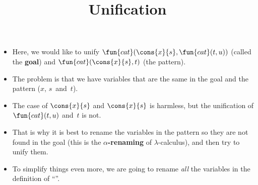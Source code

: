 \documentclass[wide]{slides}
\begin{document}
\begin{slide}
  \title{Unification}

  \begin{itemize}

    \item Here, we would like to unify
      \(\fun{cat}(\cons{x}{s},\fun{cat}(t,u))\) (called the
      \textbf{goal}) and \(\fun{cat}(\cons{x}{s},t)\) (the pattern).

    \item The problem is that we have variables that are the same in
      the goal and the pattern (\(x\), \(s\)~and~\(t\)).

    \item The case of \(\cons{x}{s}\) and \(\cons{x}{s}\) is harmless,
      but the unification of \(\fun{cat}(t,u)\) and~\(t\) is not.

    \item That is why it is best to rename the variables in the
      pattern so they are not found in the goal (this is the
      \textbf{\(\alpha\)\hyp{}renaming} of \(\lambda\)\hyp{}calculus),
      and then try to unify them.

    \item To simplify things even more, we are going to rename
      \emph{all} the variables in the definition of ``''.

  \end{itemize}

\end{slide}
\end{document}
